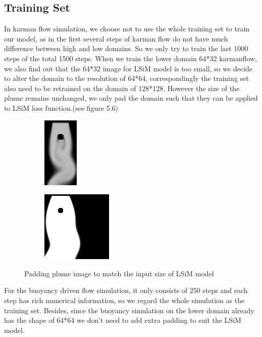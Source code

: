 \documentclass[a4paper,12pt,twoside]{report}
\begin{document}
\subsection{Training Set}
In karman flow simulation, we choose not to use the whole training set to train our model, as in the first several steps of karman flow do not have much difference between high and low domains. So we only try to train the last 1000 steps of the total 1500 steps. When we train the lower domain 64*32 karmanflow, we also find out that the 64*32 image for LSiM model is too small, so we decide to alter the domain to the resolution of 64*64, correspondingly the training set also need to be retrained on the domain of 128*128. However the size of the plume remains unchanged, we only pad the domain such that they can be applied to LSiM loss function.(see figure 5.6)
\begin{figure}
\centering
\begin{subfigure}{0.4\textwidth}
  \centering
  \includegraphics[scale=1]{nonpad_karmanflow.png}
  \caption{}
\end{subfigure}
\begin{subfigure}{0.4\textwidth}
  \centering
  \includegraphics[scale=1]{pad_karmanflow.png}
  \caption{}
\end{subfigure}
\caption{Padding plume image to match the input size of LSiM model}
\end{figure}
For the buoyancy driven flow simulation, it only consists of 250 steps and each step has rich numerical information, so we regard the whole simulation as the training set. Besides, since the buoyancy simulation on the lower domain already has the shape of 64*64 we don't need to add extra padding to suit the LSiM model.
\end{document}
